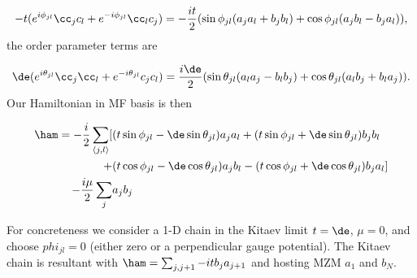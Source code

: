 \begin{equation}
  -t ( e^{i\phi_{jl}} \cc_j c_l + e^{-i\phi_{jl}} \cc_l c_j) = -\dfrac{it}{2} ( \sin\phi_{jl} (a_j a_l + b_j b_l) + \cos\phi_{jl} (a_j b_l - b_j a_l) ),
\end{equation}
the order parameter terms are

\begin{equation}
  \de ( e^{i\theta_{jl}} \cc_j \cc_l + e^{-i\theta_{jl}} c_j c_l) = \dfrac{i\de}{2} ( \sin\theta_{jl} (a_l a_j - b_l b_j) + \cos\theta_{jl} (a_l b_j + b_l a_j) ).
\end{equation}
Our Hamiltonian in MF basis is then

\begin{align}
  \ham =  - \dfrac{i}{2} \sum_{\langle j,l\rangle} [&(t\sin\phi_{jl}-\de\sin\theta_{jl}) a_j a_l + (t\sin\phi_{jl}+\de\sin\theta_{jl}) b_j b_l \nonumber \\
  +&(t\cos\phi_{jl}-\de\cos\theta_{jl}) a_j b_l - (t\cos\phi_{jl}+\de\cos\theta_{jl}) b_j a_l] \nonumber\\
  -\dfrac{i\mu}{2} \sum_j & a_j b_j
\end{align}

For concreteness we consider a 1-D chain in the Kitaev limit $t=\de$, $\mu=0$, and choose $phi_{jl}=0$ (either zero or a perpendicular gauge potential).
The Kitaev chain is resultant with $\ham = \sum_{j,j+1} -it b_j a_{j+1}$ and hosting MZM $a_1$ and $b_N$.

